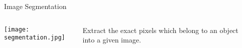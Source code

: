 \documentclass[10pt, technote, oribibl, unicode]{beamer}
\begin{document}
\begin{frame}
\begin{columns}
\begin{column}{0.5\textwidth}
    \end{column}
    \begin{column}{0.5\textwidth}
      \begin{alertblock}{Image Segmentation}
        \begin{columns}
          \begin{column}{0.5\textwidth}
            \hspace*{0.19cm}
            \texttt{[image: segmentation.jpg]}
          \end{column}
          \begin{column}{0.42\textwidth}
            Extract the exact pixels which belong to an object into a given image.
          \end{column}
        \end{columns}
      \end{alertblock}
    \end{column}
  \end{columns}

\end{frame}
\end{document}
